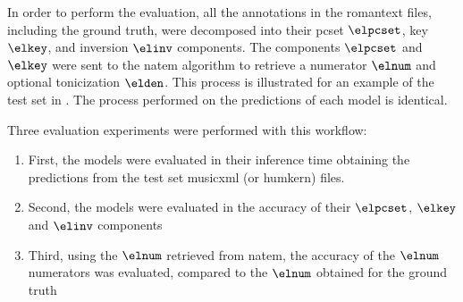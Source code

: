 
In order to perform the evaluation, all the annotations in
the \gls{romantext} files, including the ground truth, were
decomposed into their \gls{pcset} $\elpcset$, key $\elkey$,
and inversion $\elinv$ components. The components $\elpcset$
and $\elkey$ were sent to the \gls{natem} algorithm to
retrieve a numerator $\elnum$ and optional tonicization
$\elden$. This process is illustrated for an example of the
test set in . The process
performed on the predictions of each model is identical.

Three evaluation experiments were performed with this
workflow:
\begin{enumerate}
    \item First, the models were evaluated in their
    inference time obtaining the predictions from the test
    set \gls{musicxml} (or \gls{humkern}) files.
    \item Second, the models were evaluated in the accuracy
    of their $\elpcset$, $\elkey$ and $\elinv$ components
    \item Third, using the $\elnum$ retrieved from
    \gls{natem}, the accuracy of the $\elnum$ numerators was
    evaluated, compared to the $\elnum$ obtained for the
    ground truth
\end{enumerate}




